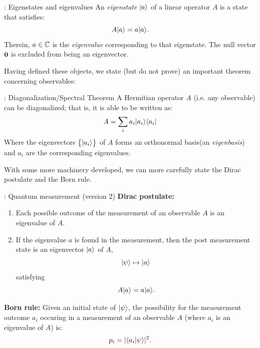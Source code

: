 \begin{defbox}{: Eigenstates and eigenvalues}\label{def-eigstates}
    An \emph{eigenstate} $\lvert a \rangle$ of a linear operator $A$ is a state that satisfies:
    \begin{equation}
        A\lvert a \rangle = a\lvert a \rangle.
    \end{equation}
    Therein, $a \in \mathbb{C}$ is the \emph{eigenvalue} corresponding to that eigenstate. The null vector $\mathbf{0}$ is excluded from being an eigenvector.
\end{defbox}

Having defined these objects, we state (but do not prove) an important theorem concerning observables:

\begin{thmbox}{: Diagonalization/Spectral Theorem}
    A Hermitian operator $A$ (i.e. any observable) can be diagonalized; that is, it is able to be written as:
    \begin{equation}
        A = \sum_i a_i \lvert a_i \rangle \langle a_i \rvert
    \end{equation}
    Where the eigenvectors $\set{\lvert a_i \rangle}$ of $A$ forms an orthonormal basis\footnotemark (an \emph{eigenbasis}) and $a_i$ are the corresponding eigenvalues.
\end{thmbox}
With some more machinery developed, we can more carefully state the Dirac postulate and the Born rule.

\begin{axiombox}{: Quantum measurement (version 2)}
    \textbf{Dirac postulate:}
    \begin{enumerate}
        \item Each possible outcome of the measurement of an observable $A$ is an eigenvalue of $A$.
        \item If the eigenvalue $a$ is found in the measurement, then the post measurement state is an eigenvector $\lvert a \rangle$ of $A$,
        \begin{equation}
            \lvert \psi \rangle \mapsto \lvert a \rangle
        \end{equation}
        satisfying
        \begin{equation}
            A\lvert a \rangle = a\lvert a \rangle.
        \end{equation}
    \end{enumerate}

    \textbf{Born rule:} Given an initial state of $\lvert \psi \rangle$, the possibility for the measurement outcome $a_i$ occuring in a measurement of an observable $A$ (where $a_i$ is an eigenvalue of $A$) is:
    \begin{equation}
        p_i = \lvert \langle a_i \lvert \psi \rangle \rvert^2.
    \end{equation}
\end{axiombox}

